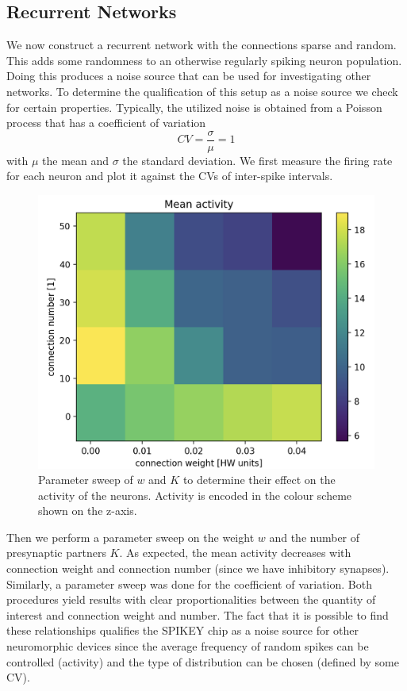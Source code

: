 \documentclass[a4paper,twocolumn]{article}
\begin{document}
\subsection{Recurrent Networks}
We now construct a recurrent network with the connections sparse and random.
This adds some randomness to an otherwise regularly spiking neuron population.
Doing this produces a noise source that can be used for investigating other networks.
To determine the qualification of this setup as a noise source we check for certain
properties.  Typically,  the utilized noise is obtained from a Poisson process
that has a coefficient of variation
\begin{equation}
	CV = \frac{\sigma}{\mu} = 1
\end{equation}
with $\mu$ the mean and $\sigma$ the standard deviation. We first measure the
firing rate for each neuron and plot it against the CVs of inter-spike intervals.
\begin{figure}[ht]
    \centering
    \includegraphics[width=.5\textwidth]{figures/activity_sweep.png}
    \caption{Parameter sweep of $w$ and $K$ to determine their effect on the activity 
    of the neurons.  Activity is encoded in the colour scheme shown on the z-axis.}
    \label{fig:activity_sweep}
\end{figure}
Then we perform a parameter sweep on the weight $w$ and the number of presynaptic
partners $K$.  As expected, the mean activity decreases with connection weight
and connection number (since we have inhibitory synapses).  Similarly,  a parameter sweep
was done for the coefficient of variation.  Both procedures yield results with clear proportionalities
between the quantity of interest and connection weight and number.  The fact that it is possible
to find these relationships qualifies the SPIKEY chip as a noise source for other neuromorphic
devices since the average frequency of random spikes can be controlled (activity) and the type
of distribution can be chosen (defined by some CV).
\end{document}
